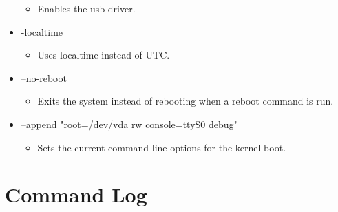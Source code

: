 \documentclass[10pt,onecolumn,journal,draftclsnofoot]{IEEEtran}
\begin{document}
\begin{itemize}
\begin{itemize}
\item{Enables the usb driver.}
\end{itemize}
\item -localtime
\begin{itemize}
\item{Uses localtime instead of UTC.}
\end{itemize}
\item --no-reboot
\begin{itemize}
\item{Exits the system instead of rebooting when a reboot command is run.}
\end{itemize}
\item --append "root=/dev/vda rw console=ttyS0 debug"
\begin{itemize}
\item{Sets the current command line options for the kernel boot.}
\end{itemize}

\end{itemize}

\newpage

\section{Command Log}
\end{document}
